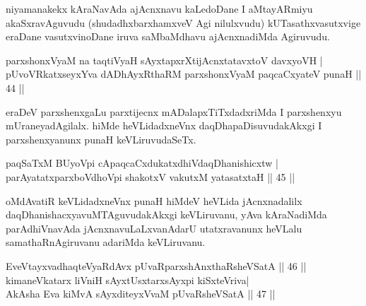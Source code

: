 \begin{artha}%
niyamanakekx kAraNavAda ajAcnxnavu kaLedoDane I aMtayARmiyu akaSxravAguvudu (shudadhxbarxhamxveV Agi nilulxvudu) kUTasathxvasutxvige eraDane vasutxvinoDane iruva saMbaMdhavu ajAcnxnadiMda Agiruvudu.
\end{artha}


\begin{shl}
parxshonxV\s yaM na taqtiVyaH sAyxtapxrXtijAcnxtatavxtoV davxyoVH |\\
pUvoVRkatxseyxYva dADhAyxRthaRM parxshonxV\s yaM paqcaCxyateV punaH \hfill || 44 ||
\end{shl}

\begin{artha}
eraDeV parxshenxgaLu parxtijecnx mADalapxTiTxdadxriMda I parxshenxyu mUraneyadAgilalx. hiMde heVLidadxneVnx daqDhapaDisuvudakAkxgi I parxshenxyanunx punaH keVLiruvudaSeTx.
\end{artha}

\begin{shl}
paqSaTxM BUyoV\s pi cApaqcaCxdukatxdhiVdaqDhanishicxtw |\\
\footnotemark[1]parAyatatxparxboVdhoV\s pi shakotxV vakutxM yatasatxtaH \hfill || 45 ||
\end{shl}

\begin{artha}
oMdAvatiR keVLidadxneVnx punaH hiMdeV heVLida jAcnxnadalilx daqDhanishacxyavuMTAgu\-vudakAkxgi keVLiruvanu, yAva kAraNadiMda parAdhiVnavAda jAcnxnavuLaLxvanAdarU utatxravanunx heVLalu samathaRnAgiruvanu adariMda keVLiruvanu.
\end{artha}

\begin{shl}
EveVtayxvadhaqteVyaRdAvx pUvaRparxshAnxthaRsheVSatA \hfill || 46 ||\\
kimaneVkatarx liVniH sAyxtUsxtarxsAyxpi kiSxteVriva|\\
AkAsha Eva kiMvA sAyxditeyxVvaM pUvaRsheVSatA \hfill || 47 ||
\end{shl}

